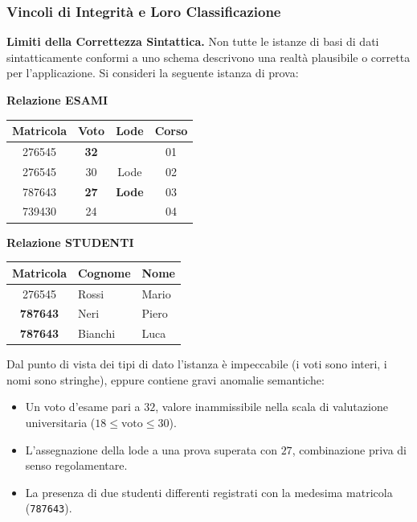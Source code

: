 \documentclass[12pt]{extarticle}
\begin{document}
\subsubsection{Vincoli di Integrità e Loro Classificazione}
\noindent \textbf{Limiti della Correttezza Sintattica.} Non tutte le istanze di basi di dati sintatticamente conformi a uno schema descrivono una realtà plausibile o corretta per l'applicazione. Si consideri la seguente istanza di prova:
\begin{center}
\small
\textbf{Relazione ESAMI} \\[1ex]
\begin{tabular}{cccc}
    \toprule
    \textbf{Matricola} & \textbf{Voto} & \textbf{Lode} & \textbf{Corso} \\
    \midrule
    276545 & \textbf{32} & & 01 \\
    276545 & 30 & Lode & 02 \\
    787643 & \textbf{27} & \textbf{Lode} & 03 \\
    739430 & 24 & & 04 \\
    \bottomrule
\end{tabular}
\qquad
\textbf{Relazione STUDENTI} \\[1ex]
\begin{tabular}{cll}
    \toprule
    \textbf{Matricola} & \textbf{Cognome} & \textbf{Nome} \\
    \midrule
    276545 & Rossi & Mario \\
    \textbf{787643} & Neri & Piero \\
    \textbf{787643} & Bianchi & Luca \\
    \bottomrule
\end{tabular}
\end{center}
\medskip
\noindent Dal punto di vista dei tipi di dato l'istanza è impeccabile (i voti sono interi, i nomi sono stringhe), eppure contiene gravi anomalie semantiche:
\begin{itemize}
    \item Un voto d'esame pari a $32$, valore inammissibile nella scala di valutazione universitaria ($18 \le \text{voto} \le 30$).
    \item L'assegnazione della lode a una prova superata con $27$, combinazione priva di senso regolamentare.
    \item La presenza di due studenti differenti registrati con la medesima matricola (\texttt{787643}).
\end{itemize}
\end{document}
